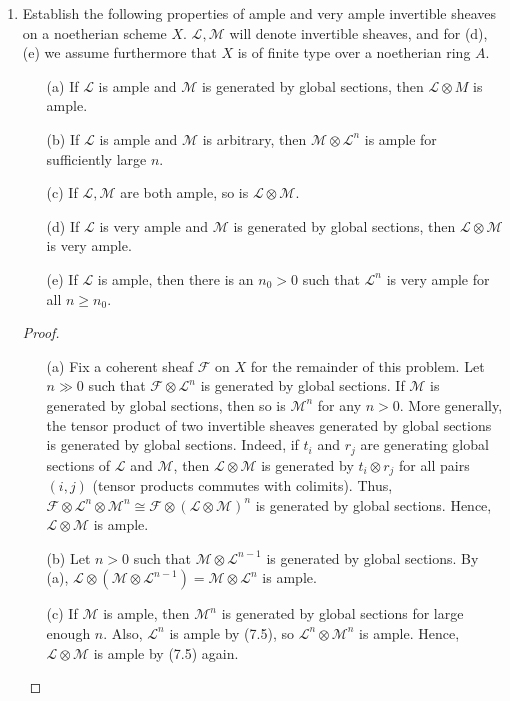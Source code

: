 \documentclass{article}
\newcommand{\fF}{\mathcal{F}}
\newcommand{\fL}{\mathcal{L}}
\newcommand{\fM}{\mathcal{M}}
\begin{document}
\begin{enumerate} [label=\textbf{\arabic*.}, leftmargin=-0em]
\item Establish the following properties of ample and very ample invertible sheaves on a noetherian scheme $X$. $\fL, \fM$ will denote invertible sheaves, and for (d), (e) we assume furthermore that $X$ is of finite type over a noetherian ring $A$.
\begin{itemize}
    \item[(a)] If $\fL$ is ample and $\fM$ is generated by global sections, then $\fL \otimes M$ is ample.
    \item[(b)] If $\fL$ is ample and $\fM$ is arbitrary, then $\fM \otimes \fL^n$ is ample for sufficiently large $n$.
    \item[(c)] If $\fL, \fM$ are both ample, so is $\fL \otimes \fM$.
    \item[(d)] If $\fL$ is very ample and $\fM$ is generated by global sections, then $\fL \otimes \fM$ is very ample.
    \item[(e)] If $\fL$ is ample, then there is an $n_0 > 0$ such that $\fL^n$ is very ample for all $n \geq n_0$.
\end{itemize}

\begin{proof} $ $ \vspace{0pt}
\begin{itemize}
\item[(a)] Fix a coherent sheaf $\fF$ on $X$ for the remainder of this problem. Let $n \gg 0$ such that $\fF \otimes \fL^n$ is generated by global sections. If $\fM$ is generated by global sections, then so is $\fM^n$ for any $n > 0$. More generally, the tensor product of two invertible sheaves generated by global sections is generated by global sections. Indeed, if $t_i$ and $r_j$ are generating global sections of $\fL$ and $\fM$, then $\fL \otimes \fM$ is generated by $t_i \otimes r_j$ for all pairs $(i, j)$ (tensor products commutes with colimits). Thus, $\fF \otimes \fL^n \otimes \fM^n \cong \fF \otimes (\fL \otimes \fM)^n$ is generated by global sections. Hence, $\fL \otimes \fM$ is ample.

\item[(b)] Let $n > 0$ such that $\fM \otimes \fL^{n - 1}$ is generated by global sections. By (a), $\fL \otimes (\fM \otimes \fL^{n - 1}) = \fM \otimes \fL^n$ is ample.

\item[(c)] If $\fM$ is ample, then $\fM^n$ is generated by global sections for large enough $n$. Also, $\fL^n$ is ample by (7.5), so $\fL^n \otimes \fM^n$ is ample. Hence, $\fL \otimes \fM$ is ample by (7.5) again.


\end{itemize}
\end{proof}
\end{enumerate}
\end{document}
